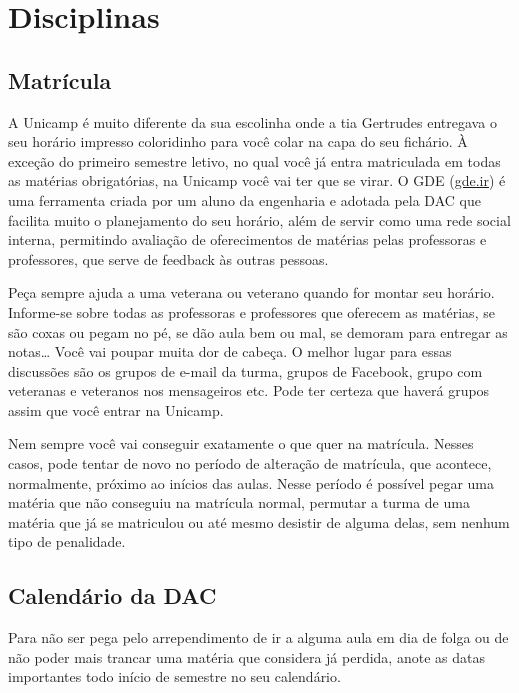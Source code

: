 
\section{Disciplinas}

\subsection{Matrícula}

A Unicamp é muito diferente da sua escolinha onde a tia Gertrudes entregava o
seu horário impresso coloridinho para você colar na capa do seu fichário. À
exceção do primeiro semestre letivo, no qual você já entra matriculada em todas
as matérias obrigatórias, na Unicamp você vai ter que se virar. O GDE
(\url{gde.ir}) é uma ferramenta criada por um aluno da engenharia e adotada
pela DAC que facilita muito o planejamento do seu horário, além de servir como
uma rede social interna, permitindo avaliação de oferecimentos de matérias
pelas professoras e professores, que serve de feedback às outras pessoas.

Peça sempre ajuda a uma veterana ou veterano quando for montar seu horário.
Informe-se sobre todas as professoras e professores que oferecem as matérias,
se são coxas ou pegam no pé, se dão aula bem ou mal, se demoram para entregar
as notas{\dots} Você vai poupar muita dor de cabeça. O melhor lugar para essas
discussões são os grupos de e-mail da turma, grupos de Facebook, grupo com
veteranas e veteranos nos mensageiros etc. Pode ter certeza que haverá grupos
assim que você entrar na Unicamp.

Nem sempre você vai conseguir exatamente o que quer na matrícula. Nesses casos,
pode tentar de novo no período de alteração de matrícula, que acontece,
normalmente, próximo ao inícios das aulas. Nesse período é possível pegar uma
matéria que não conseguiu na matrícula normal, permutar a turma de uma matéria
que já se matriculou ou até mesmo desistir de alguma delas, sem nenhum tipo de
penalidade.

\subsection{Calendário da DAC}

Para não ser pega pelo arrependimento de ir a alguma aula em dia de folga ou de
não poder mais trancar uma matéria que considera já perdida, anote as datas
importantes todo início de semestre no seu calendário.

